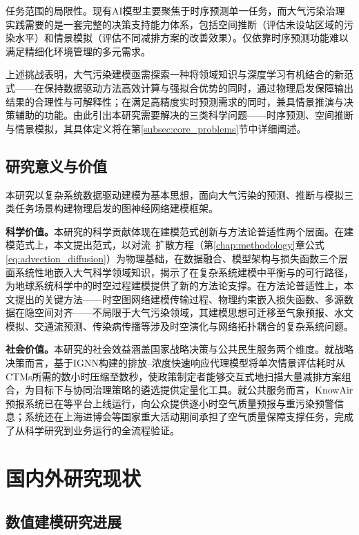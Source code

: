 任务范围的局限性。现有AI模型主要聚焦于时序预测单一任务，而大气污染治理实践需要的是一套完整的决策支持能力体系，包括空间推断（评估未设站区域的污染水平）和情景模拟（评估不同减排方案的改善效果）。仅依靠时序预测功能难以满足精细化环境管理的多元需求。

上述挑战表明，大气污染建模亟需探索一种将领域知识与深度学习有机结合的新范式——在保持数据驱动方法高效计算与强拟合优势的同时，通过物理启发保障输出结果的合理性与可解释性；在满足高精度实时预测需求的同时，兼具情景推演与决策辅助的功能。由此引出本研究需要解决的三类科学问题——时序预测、空间推断与情景模拟，其具体定义将在第\ref{subsec:core_problems}节中详细阐述。

\subsection{研究意义与价值}
\label{subsec:significance}

本研究以复杂系统数据驱动建模为基本思想，面向大气污染的预测、推断与模拟三类任务场景构建物理启发的图神经网络建模框架。

\textbf{科学价值。}本研究的科学贡献体现在建模范式创新与方法论普适性两个层面。在建模范式上，本文提出范式，以对流--扩散方程（第\ref{chap:methodology}章公式\eqref{eq:advection_diffusion}）为物理基础，在数据融合、模型架构与损失函数三个层面系统性地嵌入大气科学领域知识，揭示了在复杂系统建模中平衡与的可行路径，为地球系统科学中的时空过程建模提供了新的方法论支撑。在方法论普适性上，本文提出的关键方法——时空图网络建模传输过程、物理约束嵌入损失函数、多源数据在隐空间对齐——不局限于大气污染领域，其建模思想可迁移至气象预报、水文模拟、交通流预测、传染病传播等涉及时空演化与网络拓扑耦合的复杂系统问题。

\textbf{社会价值。}本研究的社会效益涵盖国家战略决策与公共民生服务两个维度。就战略决策而言，基于IGNN构建的排放--浓度快速响应代理模型将单次情景评估耗时从CTMs所需的数小时压缩至数秒，使政策制定者能够交互式地扫描大量减排方案组合，为目标下\PM 与\ozone 协同治理策略的遴选提供定量化工具。就公共服务而言，KnowAir预报系统已在等平台上线运行，向公众提供逐小时空气质量预报与重污染预警信息；系统还在上海进博会等国家重大活动期间承担了空气质量保障支撑任务，完成了从科学研究到业务运行的全流程验证。


\section{国内外研究现状}
\label{sec:literature}

\subsection{数值建模研究进展}
\label{subsec:numerical_models}

